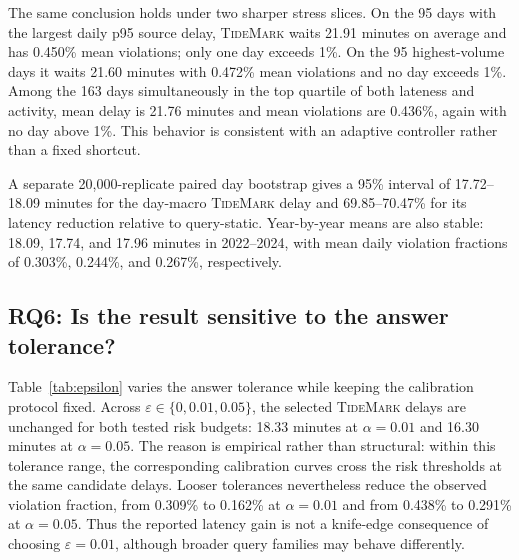 \documentclass[conference]{IEEEtran}
\newcommand{\tidemark}{\textsc{TideMark}}
\newcommand{\eps}{\varepsilon}
\begin{document}
\begin{table}[t]
\caption{Held-out stress slices for \tidemark, $\eps=0.01$, $\alpha=0.01$. Quartiles are defined over the 950 test days.}
\label{tab:stress}
\centering
{}
\end{table}

The same conclusion holds under two sharper stress slices. On the 95 days with the largest daily p95 source delay, \tidemark{} waits 21.91 minutes on average and has 0.450\% mean violations; only one day exceeds 1\%. On the 95 highest-volume days it waits 21.60 minutes with 0.472\% mean violations and no day exceeds 1\%. Among the 163 days simultaneously in the top quartile of both lateness and activity, mean delay is 21.76 minutes and mean violations are 0.436\%, again with no day above 1\%. This behavior is consistent with an adaptive controller rather than a fixed shortcut.

A separate 20,000-replicate paired day bootstrap gives a 95\% interval of 17.72--18.09 minutes for the day-macro \tidemark{} delay and 69.85--70.47\% for its latency reduction relative to query-static. Year-by-year means are also stable: 18.09, 17.74, and 17.96 minutes in 2022--2024, with mean daily violation fractions of 0.303\%, 0.244\%, and 0.267\%, respectively.

\subsection{RQ6: Is the result sensitive to the answer tolerance?}
Table~\ref{tab:epsilon} varies the answer tolerance while keeping the calibration protocol fixed. Across $\eps\in\{0,0.01,0.05\}$, the selected \tidemark{} delays are unchanged for both tested risk budgets: 18.33 minutes at $\alpha=0.01$ and 16.30 minutes at $\alpha=0.05$. The reason is empirical rather than structural: within this tolerance range, the corresponding calibration curves cross the risk thresholds at the same candidate delays. Looser tolerances nevertheless reduce the observed violation fraction, from 0.309\% to 0.162\% at $\alpha=0.01$ and from 0.438\% to 0.291\% at $\alpha=0.05$. Thus the reported latency gain is not a knife-edge consequence of choosing $\eps=0.01$, although broader query families may behave differently.
\end{document}
